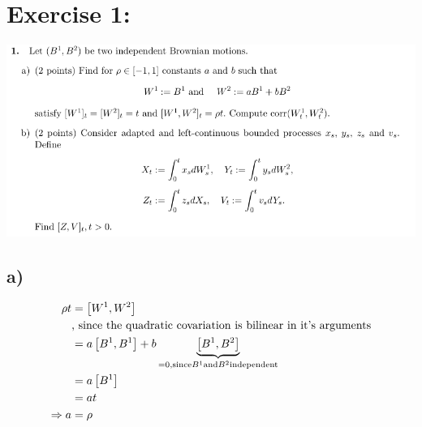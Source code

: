 \documentclass[document.tex]{subfiles}
\begin{document}
\section*{Exercise 1:}

\includegraphics[width=\textwidth]{ex1.png}

\subsection*{a)}
\begin{align*}
	\rho t &= \left[W^1 , W^2 \right] \\
	&\text{, since the quadratic covariation is bilinear in it's arguments}\\
	&= a \left[B^1 , B^1 \right] + b \underbrace{\left[B^1 , B^2 \right]}_{=0, \text{since} B^1 \text{and} B^2 \text{independent}} \\
	&= a \left[ B^1 \right] \\
	&= a t \\
\Rightarrow a &= \rho	 
\end{align*}
\end{document}
